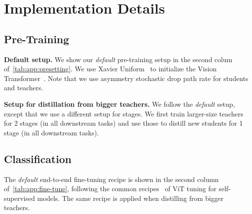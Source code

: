 \documentclass[10pt,twocolumn,letterpaper]{article}
\renewcommand{\paragraph}[1]{\vspace{1.25mm}\noindent\textbf{#1}}
\begin{document}
{\small


}







\clearpage
\newpage
\appendix

\renewcommand\thesection{\Alph{section}} 
\renewcommand\thesubsection{\Alph{section}.\arabic{subsection}} 
\renewcommand\thefigure{\Alph{section}\arabic{figure}} 
\renewcommand\thetable{\Alph{section}\arabic{table}} 
\setcounter{section}{0}
\setcounter{figure}{0}	
\setcounter{table}{0}


\section{Implementation Details}
\label{app:implementation detail}

\subsection{Pre-Training}
\label{app:pretrain}

\paragraph{Default setup.} We show our \textit{default} pre-training setup in the second colum of~\cref{tab:app:presetting}.
We use Xavier Uniform~\cite{xinitialize} to initialize the Vision Transformer~\cite{vit}. Note that we use asymmetry stochastic drop path rate for students and teachers.

\paragraph{Setup for distillation from bigger teachers.} We follow the \textit{default} setup, except that we use a different setup for stages. We first train larger-size teachers for 2 stages (in all downstream tasks) and use those to distill new students for 1 stage (in all downstream tasks). 


\subsection{Classification}
\label{app:imagenetcls}


The \textit{default} end-to-end fine-tuning recipe is shown in the second column of~\cref{tab:app:fine-tune}, following the common recipes~\cite{mae,beit} of ViT tuning for self-supervised models. The same recipe is applied when distilling from bigger teachers.
\end{document}
